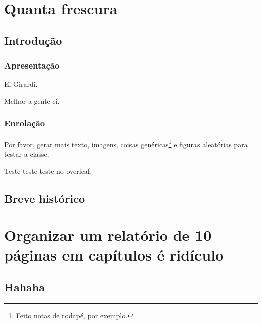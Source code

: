 \documentclass[12pt,openright,oneside,a4paper,english,brazil,oficial]{iaeRT}
\begin{document}

\chapter{Quanta frescura}

\section{Introdução}

\subsection{Apresentação}
Ei Girardi.

Melhor a gente ei.

\subsection{Enrolação}
Por favor, gerar mais texto, imagens, coisas genéricas\footnote{Feito notas de rodapé, por exemplo.} e figuras aleatórias para testar a classe.

Teste teste teste no overleaf.

\section{Breve histórico}

\lipsum[0-12]

\chapter{Organizar um relatório de 10 páginas em capítulos é ridículo}

\section{Hahaha}
%

\postextual

\begin{apendicesenv}

%

%

%

%

%

%

\end{apendicesenv}


\end{document}

